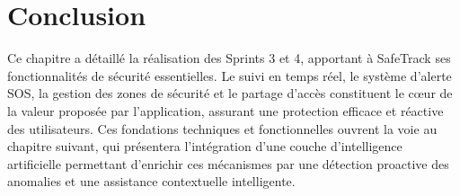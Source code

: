 \section*{Conclusion}
Ce chapitre a détaillé la réalisation des Sprints 3 et 4, apportant à SafeTrack ses fonctionnalités de sécurité essentielles. Le suivi en temps réel, le système d'alerte SOS, la gestion des zones de sécurité et le partage d'accès constituent le cœur de la valeur proposée par l'application, assurant une protection efficace et réactive des utilisateurs. Ces fondations techniques et fonctionnelles ouvrent la voie au chapitre suivant, qui présentera l'intégration d'une couche d'intelligence artificielle permettant d'enrichir ces mécanismes par une détection proactive des anomalies et une assistance contextuelle intelligente.
